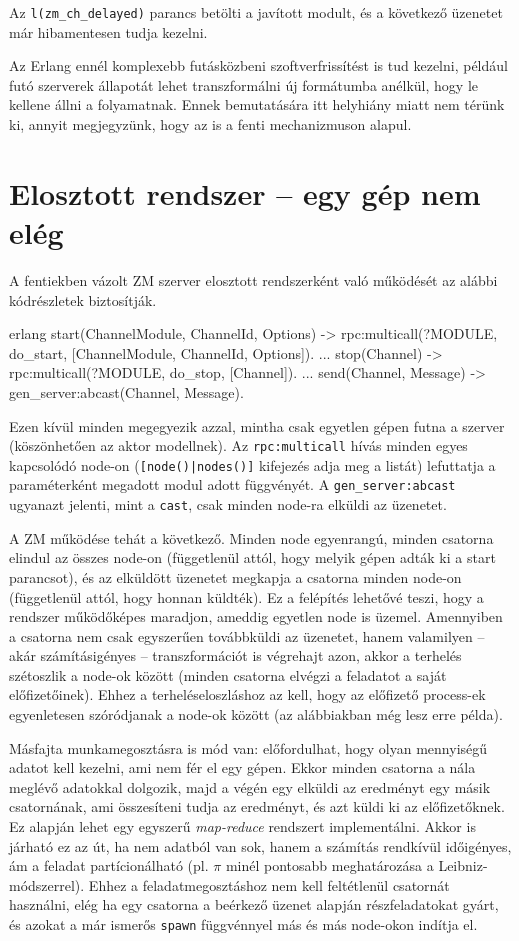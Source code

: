 \documentclass[12pt, a4paper, oneside]{book}
\begin{document}
Az \texttt{l(zm\_ch\_delayed)} parancs betölti a javított modult, és a
következő üzenetet már hibamentesen tudja kezelni.

Az Erlang ennél komplexebb futásközbeni szoftverfrissítést is tud kezelni,
például futó szerverek állapotát lehet transzformálni új formátumba anélkül,
hogy le kellene állni a folyamatnak. Ennek bemutatására itt helyhiány miatt nem
térünk ki, annyit megjegyzünk, hogy az is a fenti mechanizmuson alapul.


\section{Elosztott rendszer -- egy gép nem elég}
A fentiekben vázolt ZM szerver elosztott rendszerként való működését az alábbi
kódrészletek biztosítják.

\begin{code}{erlang}{}
start(ChannelModule, ChannelId, Options) ->
  rpc:multicall(?MODULE, do_start, 
                  [ChannelModule, ChannelId, Options]).
...
stop(Channel) ->
  rpc:multicall(?MODULE, do_stop, [Channel]).
...
send(Channel, Message) ->
  gen_server:abcast(Channel, Message).
\end{code}

Ezen kívül minden megegyezik azzal, mintha csak egyetlen gépen futna a szerver
(köszönhetően az aktor modellnek). Az \texttt{rpc:multicall} hívás minden egyes
kapcsolódó node-on (\texttt{[node()|nodes()]} kifejezés adja meg a listát)
lefuttatja a paraméterként megadott modul adott függvényét. A
\texttt{gen\_server:abcast} ugyanazt jelenti, mint a \texttt{cast}, csak minden
node-ra elküldi az üzenetet.

A ZM működése tehát a következő. Minden node egyenrangú, minden csatorna elindul
az összes node-on (függetlenül attól, hogy melyik gépen adták ki a start
parancsot), és az elküldött üzenetet megkapja a csatorna minden node-on
(függetlenül attól, hogy honnan küldték). Ez a felépítés lehetővé teszi, hogy a
rendszer működőképes maradjon, ameddig egyetlen node is üzemel. Amennyiben a
csatorna nem csak egyszerűen továbbküldi az üzenetet, hanem valamilyen -- akár
számításigényes -- transzformációt is végrehajt azon, akkor a terhelés
szétoszlik a node-ok között (minden csatorna elvégzi a feladatot a saját
előfizetőinek). Ehhez a terheléseloszláshoz az kell, hogy az előfizető
process-ek egyenletesen szóródjanak a node-ok között (az alábbiakban még lesz
erre példa).

Másfajta munkamegosztásra is mód van: előfordulhat, hogy olyan mennyiségű
adatot kell kezelni, ami nem fér el egy gépen. Ekkor minden csatorna a nála
meglévő adatokkal dolgozik, majd a végén egy elküldi az eredményt egy másik
csatornának, ami összesíteni tudja az eredményt, és azt küldi ki az
előfizetőknek. Ez alapján lehet egy egyszerű \emph{map-reduce} rendszert
implementálni. Akkor is járható ez az út, ha nem adatból van sok, hanem a
számítás rendkívül időigényes, ám a feladat partícionálható (pl. $\pi$ minél
pontosabb meghatározása a Leibniz-módszerrel). Ehhez a feladatmegosztáshoz nem
kell feltétlenül csatornát használni, elég ha egy csatorna a beérkező üzenet
alapján részfeladatokat gyárt, és azokat a már ismerős \texttt{spawn}
függvénnyel más és más node-okon indítja el.
\end{document}
